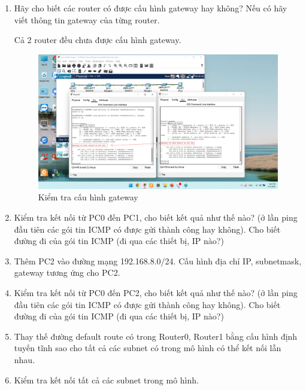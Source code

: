 \begin{enumerate}
\bf \item Hãy cho biết các router có được cấu hình gateway hay không? Nếu có hãy viết thông tin gateway của từng router.

\rm Cả 2 router đều chưa được cấu hình gateway.

\begin{figure}[H]
\begin{center}
\includegraphics[scale=0.45]{../figures/p1/p1-3}
\end{center}
\caption{Kiểm tra cấu hình gateway}
\end{figure}

\bf \item Kiểm tra kết nối từ PC0 đến PC1, cho biết kết quả như thế nào? (ở lần ping đầu tiên các gói tin ICMP có được gửi thành công hay không). Cho biết đường đi của gói tin ICMP (đi qua các thiết bị, IP nào?)

\rm

\bf \item Thêm PC2 vào đường mạng 192.168.8.0/24. Cấu hình địa chỉ IP, subnetmask, gateway tương ứng cho PC2.

\rm

\bf \item Kiểm tra kết nối từ PC0 đến PC2, cho biết kết quả như thế nào? (ở lần ping đầu tiên các gói tin ICMP có được gửi thành công hay không). Cho biết đường đi của gói tin ICMP (đi qua các thiết bị, IP nào?)

\rm

\bf \item Thay thế đường default route có trong Router0, Router1 bằng cấu hình định tuyến tĩnh sao cho tất cả các subnet có trong mô hình có thể kết nối lẫn nhau.

\rm

\bf \item Kiểm tra kết nối tất cả các subnet trong mô hình.
\end{enumerate}
